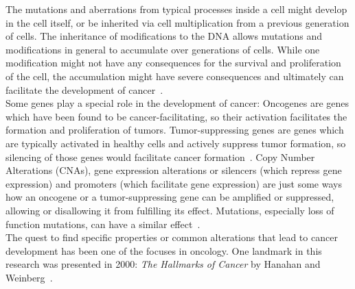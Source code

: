 The mutations and aberrations from typical processes inside a cell might develop in the cell itself, or be inherited via cell multiplication from a previous generation of cells. The inheritance of modifications to the DNA allows mutations and modifications in general to accumulate over generations of cells. While one modification might not have any consequences for the survival and proliferation of the cell, the accumulation might have severe consequences and ultimately can facilitate the development of cancer~\cite{stem_cell_mutations}.\\
Some genes play a special role in the development of cancer: Oncogenes are genes which have been found to be cancer-facilitating, so their activation facilitates the formation and proliferation of tumors. Tumor-suppressing genes are genes which are typically activated in healthy cells and actively suppress tumor formation, so silencing of those genes would facilitate cancer formation~\cite{weinberg_biology_of_cancer}. Copy Number Alterations (CNAs), gene expression alterations or silencers (which repress gene expression) and promoters (which facilitate gene expression) are just some ways how an oncogene or a tumor-suppressing gene can be amplified or suppressed, allowing or disallowing it from fulfilling its effect. Mutations, especially loss of function mutations, can have a similar effect~\cite{introduction_to_genetic_analysis}.\\
The quest to find specific properties or common alterations that lead to cancer development has been one of the focuses in oncology. One landmark in this research was presented in 2000: \textit{The Hallmarks of Cancer} by Hanahan and Weinberg~\cite{hallmarks-of-cancer}.
